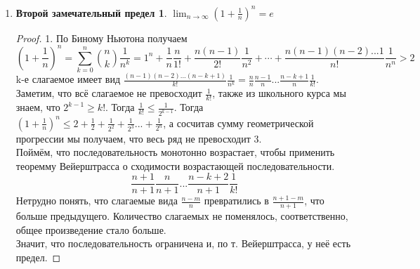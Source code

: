 \documentclass{article}
\theoremstyle{plain}
\def\letus{%
    \mathord{\setbox0=\hbox{$\exists$}%
             \hbox{\kern 0.125\wd0%
                   \vbox to \ht0{%
                      \hrule width 0.75\wd0%
                      \vfill%
                      \hrule width 0.75\wd0}%
                   \vrule height \ht0%
                   \kern 0.125\wd0}%
           }%
}
\begin{document}
\begin{enumerate}
\begin{th13*}
        \end{th13*}
        \begin{proof}
            Рассмотрим возрастающую и ограниченную последовательность (для убывающей и ограниченной снизу аналогично).
            $$\letus\,A = \sup_{n \in \mathbb{N}}{{x_n}} \implies \forall\,x_n\le A \text{ и } \forall\,\varepsilon > 0\; \exists\, N \in \mathbb{N}: x_N > A - \varepsilon$$
            Т. к. последовательность возрастает $\forall\, n \in \mathbb{N}\rightarrow x_{n + 1} \ge x_n$  и $x_n > A - \varepsilon.$
            $$A - \varepsilon < x_n \le A < A + \varepsilon \implies |x_n - A| <\varepsilon\; \forall\, n > N$$
            $$\implies \forall\, \varepsilon\; \exists\, N \in \mathbb{N}: \forall\, n > N \rightarrow |x_n - A| < \varepsilon$$
        \end{proof}
        \item \newtheorem*{e*}{Второй замечательный предел}
        \begin{e*}
            $\lim_{n \to \infty}{(1 + \frac{1}{n})}^{n} = e$
        \end{e*}
        \begin{proof}
            1. По Биному Ньютона получаем 
            $$(1 + \frac{1}{n})^{n} = \sum_{k = 0}^{n}{\binom{n}{k}\frac{1}{n ^{k}}} = 1^n + \frac{1}{n}\frac{n}{1!} + \frac{n(n - 1)}{2!}\frac{1}{n^2} + \cdots + \frac{n(n - 1)(n - 2)...1}{n!}\frac{1}{n^n} > 2$$
            k-е слагаемое имеет вид $\frac{(n - 1)(n - 2)...(n - k + 1)}{k!}\frac{1}{n^k} = \frac{n}{n}\frac{n - 1}{n}...\frac{n - k + 1}{n}\frac{1}{k!}.$ Заметим, что всё слагаемое не превосходит $\frac{1}{k!}$, также из школьного курса мы знаем, что $2^{k - 1} \ge k!$. Тогда $\frac{1}{k!} \le \frac{1}{2^{k - 1}}$. Тогда $(1 + \frac{1}{n})^n \le 2 + \frac{1}{2} + \frac{1}{2^2} + \frac{1}{2^3} ... + \frac{1}{2^n}$, а сосчитав сумму геометрической прогрессии мы получаем, что весь ряд не превосходит 3. \\
            Поймём, что последовательность монотонно возрастает, чтобы применить теоремму Вейерштрасса о сходимости возрастающей последовательности.
            $$\frac{n + 1}{n + 1}\frac{n}{n + 1}...\frac{n - k + 2}{n + 1}\frac{1}{k!}$$
            Нетрудно понять, что слагаемые вида $\frac{n - m}{n}$ превратились в $\frac{n + 1 - m}{n + 1}$, что больше предыдущего. Количество слагаемых не поменялось, соответственно, общее произведение стало больше. \\
            Значит, что последовательность ограничена и, по т. Вейерштрасса, у неё есть предел.
        \end{proof}
\end{enumerate}
\end{document}
